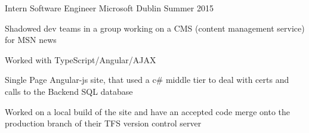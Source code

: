 

\begin{cventries}

  \cventry
    {Intern Software Engineer} %
    {Microsoft} %
    {Dublin} %
    {Summer 2015} %
    {
      \begin{cvitems} %
        \item {Shadowed dev teams in a group working on a CMS (content management service) for MSN news}
        \item {Worked with TypeScript/Angular/AJAX}
        \item {Single Page Angular-js site, that used a c# middle tier to deal with certs and calls to the Backend SQL database}
        \item {Worked on a local build of the site and have an accepted code merge onto the production branch of their TFS version control server}
      \end{cvitems}
    }



\end{cventries}
